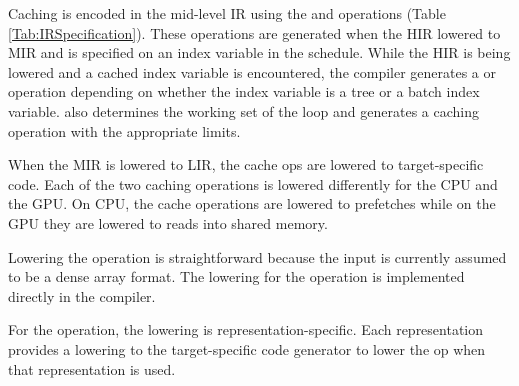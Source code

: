 Caching is encoded in the mid-level IR using the  and  operations (Table \ref{Tab:IRSpecification}). 
These operations are generated when the HIR lowered to MIR and  is specified on an 
index variable in the schedule. While the HIR is being lowered and a cached index variable is 
encountered, the compiler generates a  or  operation depending on 
whether the index variable is a tree or a batch index variable.
\Treebeard{} also determines the working set of the loop  
and generates a caching operation with the appropriate limits.


When the MIR is lowered to LIR, the cache ops are lowered to target-specific code. Each of 
the two caching operations is lowered differently for the CPU and the GPU. On CPU, the cache operations are lowered to prefetches while
on the GPU they are lowered to reads into shared memory.

Lowering the  operation is straightforward
because the input is currently assumed to be a dense
array format. The lowering for the  operation is implemented directly in the \Treebeard{} compiler.

For the  operation, the lowering is representation-specific. Each representation
provides a lowering to the target-specific code 
generator to lower the  op when
that representation is used.
